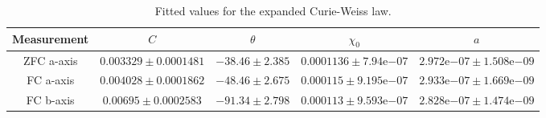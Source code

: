 
\begin{table}
    \centering
    \caption{Fitted values for the expanded Curie-Weiss law.}
    \begin{tabular}{|c|c|c|c|c|}
        \hline
        Measurement&$C$ & $\theta$ & $\chi_0$ & $a$\\
        \hline
        ZFC a-axis & $0.003329 \pm 0.0001481$ & $-38.46 \pm 2.385$ & $0.0001136 \pm 7.94\mathrm{e}{-07}$ & $2.972\mathrm{e}{-07} \pm 1.508\mathrm{e}{-09}$\\
        FC a-axis&$0.004028 \pm 0.0001862$& $-48.46 \pm 2.675$ & $0.000115 \pm 9.195\mathrm{e}{-07}$ & $2.933\mathrm{e}{-07} \pm 1.669\mathrm{e}{-09}$\\
        FC b-axis&$0.00695 \pm 0.0002583$& $-91.34 \pm 2.798$ & $0.000113 \pm 9.593\mathrm{e}{-07} $ & $2.828\mathrm{e}{-07} \pm 1.474\mathrm{e}{-09}$\\
        \hline
    \end{tabular}
    \label{tab:fitted-values}
\end{table}